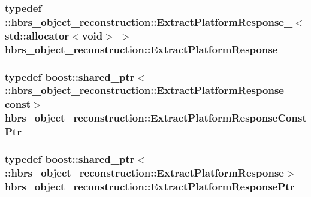 \hypertarget{namespacehbrs__object__reconstruction_ac3d2f621d6e4ff937ecd7c90e7e69104}{
\subsubsection[{\-Extract\-Platform\-Response}]{\setlength{\rightskip}{0pt plus 5cm}typedef \-::{\bf hbrs\-\_\-object\-\_\-reconstruction\-::\-Extract\-Platform\-Response\-\_\-}$<$std\-::allocator$<$void$>$ $>$ {\bf hbrs\-\_\-object\-\_\-reconstruction\-::\-Extract\-Platform\-Response}}}\label{namespacehbrs__object__reconstruction_ac3d2f621d6e4ff937ecd7c90e7e69104}
\hypertarget{namespacehbrs__object__reconstruction_aad13ee211a0d7af9cfa513261e409b70}{
\subsubsection[{\-Extract\-Platform\-Response\-Const\-Ptr}]{\setlength{\rightskip}{0pt plus 5cm}typedef boost\-::shared\-\_\-ptr$<$ \-::{\bf hbrs\-\_\-object\-\_\-reconstruction\-::\-Extract\-Platform\-Response} const$>$ {\bf hbrs\-\_\-object\-\_\-reconstruction\-::\-Extract\-Platform\-Response\-Const\-Ptr}}}\label{namespacehbrs__object__reconstruction_aad13ee211a0d7af9cfa513261e409b70}
\hypertarget{namespacehbrs__object__reconstruction_a63aca71c236e9ab28d0e3ac5156851d7}{
\subsubsection[{\-Extract\-Platform\-Response\-Ptr}]{\setlength{\rightskip}{0pt plus 5cm}typedef boost\-::shared\-\_\-ptr$<$ \-::{\bf hbrs\-\_\-object\-\_\-reconstruction\-::\-Extract\-Platform\-Response}$>$ {\bf hbrs\-\_\-object\-\_\-reconstruction\-::\-Extract\-Platform\-Response\-Ptr}}}\label{namespacehbrs__object__reconstruction_a63aca71c236e9ab28d0e3ac5156851d7}
